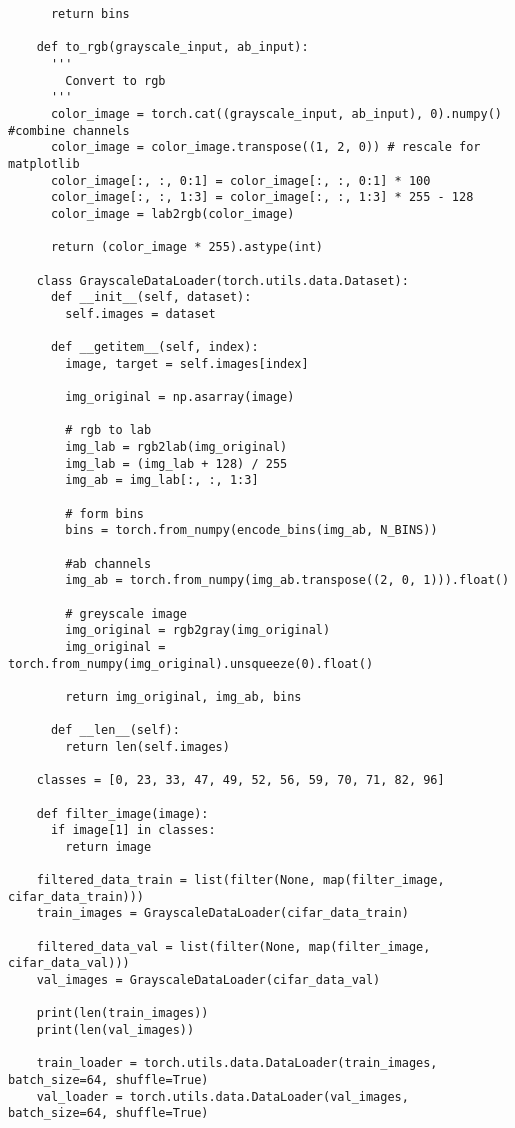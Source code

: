 \begin{longlisting}
\begin{verbatim}
      return bins

    def to_rgb(grayscale_input, ab_input):
      '''
        Convert to rgb
      '''
      color_image = torch.cat((grayscale_input, ab_input), 0).numpy() #combine channels
      color_image = color_image.transpose((1, 2, 0)) # rescale for matplotlib
      color_image[:, :, 0:1] = color_image[:, :, 0:1] * 100
      color_image[:, :, 1:3] = color_image[:, :, 1:3] * 255 - 128
      color_image = lab2rgb(color_image)
      
      return (color_image * 255).astype(int)

    class GrayscaleDataLoader(torch.utils.data.Dataset):
      def __init__(self, dataset):
        self.images = dataset

      def __getitem__(self, index):
        image, target = self.images[index]
        
        img_original = np.asarray(image)

        # rgb to lab
        img_lab = rgb2lab(img_original)
        img_lab = (img_lab + 128) / 255
        img_ab = img_lab[:, :, 1:3]

        # form bins
        bins = torch.from_numpy(encode_bins(img_ab, N_BINS))

        #ab channels
        img_ab = torch.from_numpy(img_ab.transpose((2, 0, 1))).float()

        # greyscale image
        img_original = rgb2gray(img_original)
        img_original = torch.from_numpy(img_original).unsqueeze(0).float()
        
        return img_original, img_ab, bins

      def __len__(self):
        return len(self.images)

    classes = [0, 23, 33, 47, 49, 52, 56, 59, 70, 71, 82, 96]

    def filter_image(image):
      if image[1] in classes:
        return image

    filtered_data_train = list(filter(None, map(filter_image, cifar_data_train)))
    train_images = GrayscaleDataLoader(cifar_data_train)

    filtered_data_val = list(filter(None, map(filter_image, cifar_data_val)))
    val_images = GrayscaleDataLoader(cifar_data_val)

    print(len(train_images))
    print(len(val_images))

    train_loader = torch.utils.data.DataLoader(train_images, batch_size=64, shuffle=True)
    val_loader = torch.utils.data.DataLoader(val_images, batch_size=64, shuffle=True)


\end{verbatim}
\end{longlisting}
